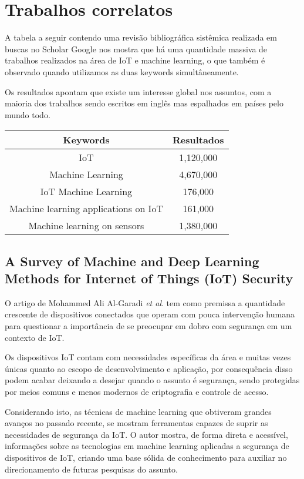 \documentclass[12pt]{article}
\begin{document}
\section{Trabalhos correlatos}

A tabela a seguir contendo uma revisão bibliográfica sistêmica realizada em buscas no Scholar Google nos mostra que há uma quantidade massiva de trabalhos realizados na área de IoT e machine learning, o que também é observado quando utilizamos as duas keywords simultâneamente.

Os resultados apontam que existe um interesse global nos assuntos, com a maioria dos trabalhos sendo escritos em inglês mas espalhados em países pelo mundo todo.

\begin{center}
    \begin{tabular}{ | c | c | }
    \hline
    Keywords & Resultados \\ 
    \hline
    IoT & 1,120,000 \\  
    \hline
    Machine Learning & 4,670,000 \\
    \hline
    IoT Machine Learning & 176,000 \\
    \hline
    Machine learning applications on IoT & 161,000 \\
    \hline
    Machine learning on sensors & 1,380,000 \\
    \hline
    \end{tabular}
\end{center}

\subsection{A Survey of Machine and Deep Learning Methods for Internet of Things (IoT) Security \cite{ali}}

O artigo de Mohammed Ali Al-Garadi \emph{et al}. tem como premissa a
quantidade crescente de dispositivos conectados que operam com
pouca intervenção humana para questionar a importância de se preocupar em dobro com segurança
em um contexto de IoT.

Os dispositivos IoT contam com necessidades específicas da área e muitas
vezes únicas quanto ao escopo de desenvolvimento e aplicação, por consequência disso podem acabar
deixando a desejar quando o assunto é segurança, sendo protegidas por meios comuns e menos modernos de criptografia e controle de acesso. 

Considerando isto, as técnicas de machine learning que obtiveram grandes avanços no passado recente, se
mostram ferramentas capazes de suprir as necessidades de segurança da IoT. O autor mostra, de forma direta e acessível, informações sobre as
tecnologias em machine learning aplicadas a segurança de dispositivos de IoT, criando uma base sólida de conhecimento para
auxiliar no direcionamento de futuras pesquisas do assunto.
\end{document}
